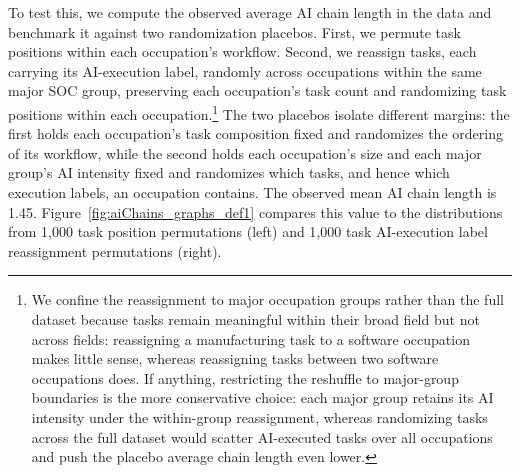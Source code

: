 To test this, we compute the observed average AI chain length in the data and benchmark it against two randomization placebos.
First, we permute task positions within each occupation's workflow.
Second, we reassign tasks, each carrying its AI-execution label, randomly across occupations within the same major SOC group, preserving each occupation's task count and randomizing task positions within each occupation.\footnote{
We confine the reassignment to major occupation groups rather than the full dataset because tasks remain meaningful within their broad field but not across fields: reassigning a manufacturing task to a software occupation makes little sense, whereas reassigning tasks between two software occupations does.
If anything, restricting the reshuffle to major-group boundaries is the more conservative choice: each major group retains its AI intensity under the within-group reassignment, whereas randomizing tasks across the full dataset would scatter AI-executed tasks over all occupations and push the placebo average chain length even lower.}
The two placebos isolate different margins: the first holds each occupation's task composition fixed and randomizes the ordering of its workflow, while the second holds each occupation's size and each major group's AI intensity fixed and randomizes which tasks, and hence which execution labels, an occupation contains.
The observed mean AI chain length is 1.45.
Figure~\ref{fig:aiChains_graphs_def1} compares this value to the distributions from 1{,}000 task position permutations (left) and 1{,}000 task AI-execution label reassignment permutations (right).
